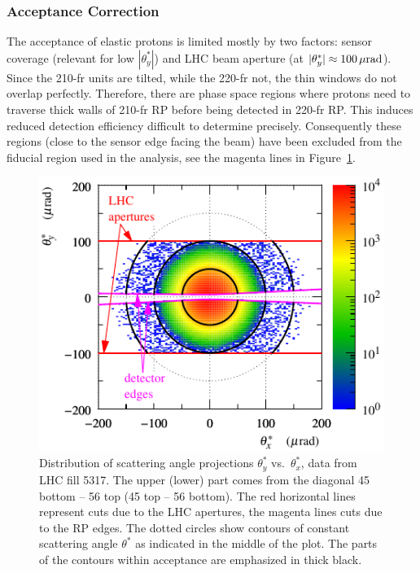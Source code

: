 
\subsubsection{Acceptance Correction}
\label{sec:acc corr}

The acceptance of elastic protons is limited mostly by two factors: sensor coverage (relevant for low $|\theta^*_y|$) and LHC beam aperture (at $|\theta^*_y| \approx 100\,{\rm \mu rad}$). Since the 210-fr units are tilted, while the 220-fr not, the thin windows do not overlap perfectly. Therefore, there are phase space regions where protons need to traverse thick walls of 210-fr RP before being detected in 220-fr RP. This induces reduced detection efficiency difficult to determine precisely. Consequently these regions (close to the sensor edge facing the beam) have been excluded from the fiducial region used in the analysis, see the magenta lines in Figure~\ref{fig:acc corr princ}.

\begin{figure}
\begin{center}
\includegraphics{fig/acc_phi_lab.pdf}
\caption{%
Distribution of scattering angle projections $\theta_y^*$ vs.~$\theta_x^*$, data from LHC fill 5317. The upper (lower) part comes from the diagonal 45 bottom -- 56 top (45 top -- 56 bottom). The red horizontal lines represent cuts due to the LHC apertures, the magenta lines cuts due to the RP edges. The dotted circles show contours of constant scattering angle $\theta^*$ as indicated in the middle of the plot. The parts of the contours within acceptance are emphasized in thick black.
}
\label{fig:acc corr princ}
\end{center}
\end{figure}

